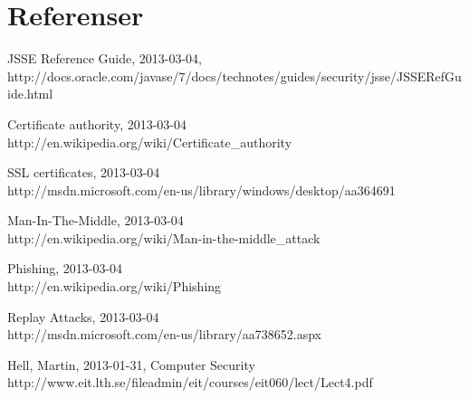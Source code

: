 \section{Referenser}

\begin{thebibliography}{1}
	
	JSSE Reference Guide, 2013-03-04,
	\\http://docs.oracle.com/javase/7/docs/technotes/guides/security/jsse/JSSERefGuide.html
	
	Certificate authority, 2013-03-04
	\\http://en.wikipedia.org/wiki/Certificate\_authority
	
	SSL certificates, 2013-03-04
	\\http://msdn.microsoft.com/en-us/library/windows/desktop/aa364691%
	
	Man-In-The-Middle, 2013-03-04
	\\http://en.wikipedia.org/wiki/Man-in-the-middle\_attack
	
	
	Phishing, 2013-03-04
	\\http://en.wikipedia.org/wiki/Phishing
	
	Replay Attacks, 2013-03-04
	\\http://msdn.microsoft.com/en-us/library/aa738652.aspx
	
	Hell, Martin, 2013-01-31, Computer Security
	\\http://www.eit.lth.se/fileadmin/eit/courses/eit060/lect/Lect4.pdf
	
\end{thebibliography}